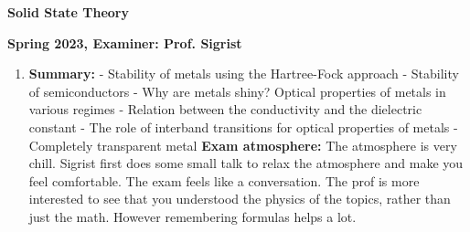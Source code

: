 \documentclass{article}%
\begin{document}
%
\normalsize%
\begin{center}%
\begin{Large}%
\textbf{Solid State Theory}%
\end{Large}%
\linebreak%
\end{center}%
\begin{center}%
\begin{large}%
\textbf{Spring 2023, Examiner: Prof. Sigrist}%
\end{large}%
\end{center}%
\begin{enumerate}%
\item%
\begin{mycolorbox}%
\textbf{Summary:}%
\newline%
{-} Stability of metals using the Hartree{-}Fock approach\newline%
{-} Stability of semiconductors\newline%
{-} Why are metals shiny? Optical properties of metals in various regimes\newline%
{-} Relation between the conductivity and the dielectric constant\newline%
{-} The role of interband transitions for optical properties of metals\newline%
{-} Completely transparent metal%
\newline%
\newline%
\textbf{Exam atmosphere:}%
\newline%
The atmosphere is very chill. Sigrist first does some small talk to relax the atmosphere and make you feel comfortable. The exam feels like a conversation. The prof is more interested to see that you understood the physics of the topics, rather than just the math. However remembering formulas helps a lot.%
\end{mycolorbox}%
\end{enumerate}%
\newpage%
\end{document}
